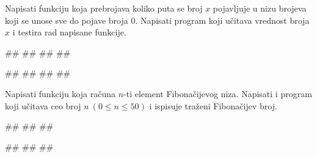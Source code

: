\begin{Exercise}[label=p1.4_17] 
Napisati funkciju  koja prebrojava
koliko puta se broj $x$ pojavljuje u nizu brojeva koji se unose sve do
pojave broja $0$. Napisati program koji učitava vrednost broja $x$ i
testira rad napisane funkcije.

\begin{miditest}
\begin{upotreba}{1}
#\naslovInt#
##
##
##
\end{upotreba}
\end{miditest}
\begin{miditest}
\begin{upotreba}{2}
#\naslovInt#
##
##
##
\end{upotreba}
\end{miditest}

\end{Exercise}
\begin{Answer}[ref=p1.4_17]
\end{Answer}


\begin{Exercise}[label=p1.4_18]
Napisati funkciju  koja računa $n$-ti
element Fibonačijevog niza. Napisati i program koji učitava ceo broj
$n\ (0\leq n\leq 50)$ i ispisuje traženi Fibonačijev broj.

\begin{miditest}
\begin{upotreba}{1}
#\naslovInt#
##
##
\end{upotreba}
\end{miditest}
\begin{miditest}
\begin{upotreba}{2}
#\naslovInt#
##
##
\end{upotreba}
\end{miditest}

\end{Exercise}
\begin{Answer}[ref=p1.4_18]
\end{Answer}

